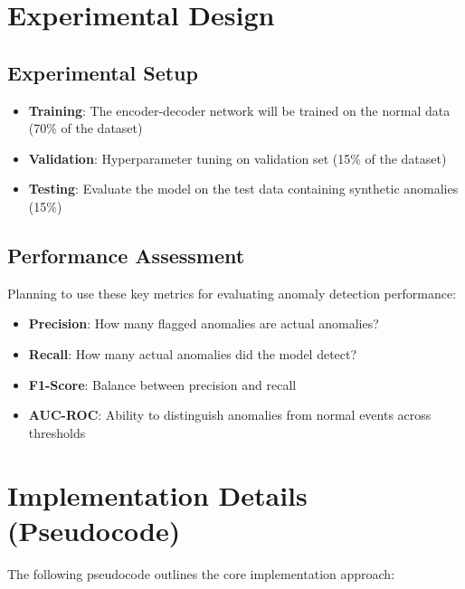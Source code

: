 \documentclass[12pt,a4paper]{article}
\begin{document}
\section{Experimental Design}

\subsection{Experimental Setup}

\begin{itemize}
    \item \textbf{Training}: The encoder-decoder network will be trained on the normal data (70\% of the dataset)
    \item \textbf{Validation}: Hyperparameter tuning on validation set (15\% of the dataset)
    \item \textbf{Testing}: Evaluate the model on the test data containing synthetic anomalies (15\%)
\end{itemize}

\subsection{Performance Assessment}

Planning to use these key metrics for evaluating anomaly detection performance:

\begin{itemize}
    \item \textbf{Precision}: How many flagged anomalies are actual anomalies?
    \item \textbf{Recall}: How many actual anomalies did the model detect?
    \item \textbf{F1-Score}: Balance between precision and recall
    \item \textbf{AUC-ROC}: Ability to distinguish anomalies from normal events across thresholds
\end{itemize}

\section{Implementation Details (Pseudocode)}

The following pseudocode outlines the core implementation approach:
\end{document}
